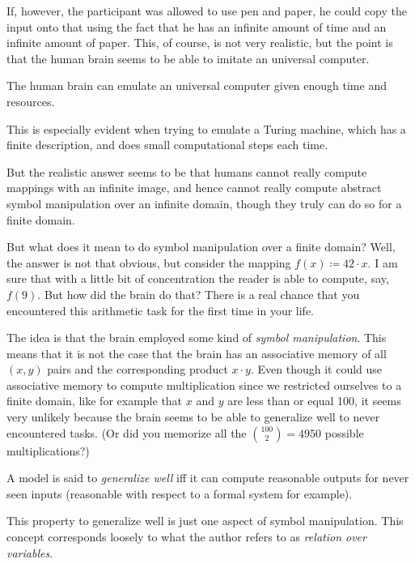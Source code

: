 \documentclass[../../main.tex]{subfiles}
\begin{document}
    If, however, the participant was allowed to use pen and paper, he could copy the input onto that using the fact that he has an infinite amount of time and an infinite amount of paper. This, of course, is not very realistic, but the point is that the human brain seems to be able to imitate an universal computer.

    \begin{axiom}
        The human brain can emulate an universal computer given enough time and resources.
    \end{axiom}

    This is especially evident when trying to emulate a Turing machine, which has a finite description, and does small computational steps each time.

    But the realistic answer seems to be that humans cannot really compute mappings with an infinite image, and hence cannot really compute abstract symbol manipulation over an infinite domain, though they truly can do so for a finite domain.

    But what does it mean to do symbol manipulation over a finite domain? Well, the answer is not that obvious, but consider the mapping $f(x) \coloneqq 42 \cdot x$. I am sure that with a little bit of concentration the reader is able to compute, say, $f(9)$. But how did the brain do that? There is a real chance that you encountered this arithmetic task for the first time in your life.

    The idea is that the brain employed some kind of \emph{symbol manipulation}. This means that it is not the case that the brain has an associative memory of all $(x, y)$ pairs and the corresponding product $x \cdot y$. Even though it could use associative memory to compute multiplication since we restricted ourselves to a finite domain, like for example that $x$ and $y$ are less than or equal 100, it seems very unlikely because the brain seems to be able to generalize well to never encountered tasks. (Or did you memorize all the $\binom{100}{2} = 4950$ possible multiplications?)

    \begin{definition}
        A model is said to \emph{generalize well} iff it can compute reasonable outputs for never seen inputs (reasonable with respect to a formal system for example).
    \end{definition}

    \begin{remark}
        This property to generalize well is just one aspect of symbol manipulation. This concept corresponds loosely to what the author refers to as \emph{relation over variables}.
    \end{remark}
\end{document}
